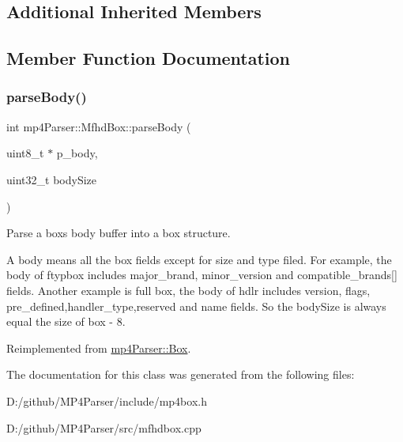 \subsection*{Additional Inherited Members}


\subsection{Member Function Documentation}
\mbox{\label{classmp4_parser_1_1_mfhd_box_a90ebfbbacfd2a91c158e6b10edc6ed43}} 
\subsubsection{\texorpdfstring{parseBody()}{parseBody()}}
{\footnotesize\ttfamily int mp4\+Parser\+::\+Mfhd\+Box\+::parse\+Body (\begin{DoxyParamCaption}\item[{uint8\+\_\+t $\ast$}]{p\+\_\+body,  }\item[{uint32\+\_\+t}]{body\+Size }\end{DoxyParamCaption})\hspace{0.3cm}{\ttfamily [virtual]}}



Parse a box\textquotesingle{}s body buffer into a box structure. 

A body means all the box fields except for size and type filed. For example, the body of ftypbox includes major\+\_\+brand, minor\+\_\+version and compatible\+\_\+brands\mbox{[}\mbox{]} fields. Another example is full box, the body of hdlr includes version, flags, pre\+\_\+defined,handler\+\_\+type,reserved and name fields. So the body\+Size is always equal the size of box -\/ 8. 

Reimplemented from \mbox{\hyperlink{classmp4_parser_1_1_box_a3dd0c084ac65bc77b69ac5ecaf796cb2}{mp4\+Parser\+::\+Box}}.



The documentation for this class was generated from the following files\+:\begin{DoxyCompactItemize}
\item 
D\+:/github/\+M\+P4\+Parser/include/mp4box.\+h\item 
D\+:/github/\+M\+P4\+Parser/src/mfhdbox.\+cpp\end{DoxyCompactItemize}
